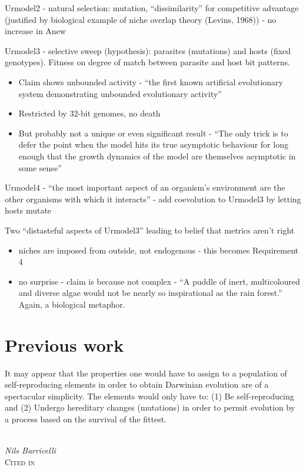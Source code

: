 Urmodel2 - natural selection: mutation, ``dissimilarity'' for
competitive advantage (justified by biological example of niche
overlap theory (Levins, 1968)) - no increase in Anew

Urmodel3 - selective sweep (hypothesis): parasites (mutations) and
hosts (fixed genotypes). Fitness on degree of match between parasite
and host bit patterns.

\begin{itemize}
	\item
	
	Claim shows unbounded activity - ``the first known artificial
	evolutionary system demonstrating unbounded evolutionary activity''
	
	\item
	
	Restricted by 32-bit genomes, no death
	
	\item
	
	But probably not a unique or even significant result - ``The only
	trick is to defer the point when the model hits its true asymptotic
	behaviour for long enough that the growth dynamics of the model are
	themselves asymptotic in some sense''
	
\end{itemize}

Urmodel4 - ``the most important aspect of an organism's environment
are the other organisms with which it interacts'' - add coevolution to
Urmodel3 by letting hosts mutate

Two ``distasteful aspects of Urmodel3'' leading to belief that metrics
aren't right

\begin{itemize}
	\item niches are imposed from outside, not endogenous - this becomes Requirement 4
	\item no surprise - claim is because not complex - ``A puddle of inert,
	multicoloured and diverse algae would not be nearly so inspirational
	as the rain forest.'' Again, a biological metaphor.	
\end{itemize}

\section{Previous work}\label{previous-work}

\epigraph{%
	It may appear that the properties one would have to assign to a population of self-reproducing elements in order to obtain Darwinian evolution are of a spectacular simplicity. The elements would only have to: (1) Be self-reproducing and (2) Undergo hereditary changes (mutations) in order to permit evolution by a process based on the survival of the fittest.}%
{\textit{\\Nils Barricelli}\\\textsc{Cited in \cite{Taylor2001}}}

